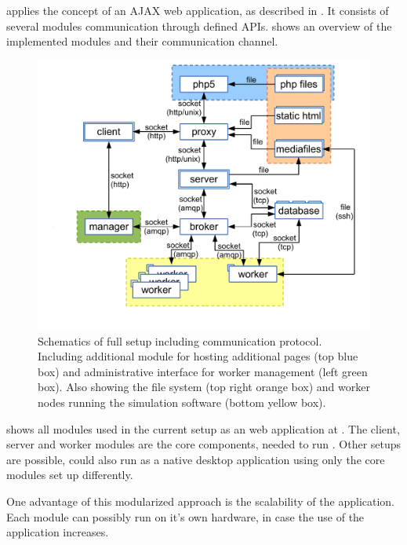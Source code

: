 

\spl applies the concept of an AJAX web application, as described in .
It consists of several modules communication through defined APIs.
 shows an overview of the implemented modules and their communication channel.

\begin{figure}[htbp]
  \centering
    \includegraphics[width=\textwidth]{fig/whole_setup.pdf}
  \caption{Schematics of full \spl setup including communication protocol. Including additional module for hosting additional pages (top blue box) and administrative interface for worker management (left green box). Also showing the file system (top right orange box) and worker nodes running the simulation software (bottom yellow box).}
  \label{fig:whole_setup}
\end{figure}


 shows all modules used in the current setup as an web application at \splurl.
The client, server and worker modules are the core components, needed to run \spl.
Other setups are possible, \spl could also run as a native desktop application using only the core modules set up differently.

One advantage of this modularized approach is the scalability of the application.
Each module can possibly run on it's own hardware, in case the use of the application increases.

